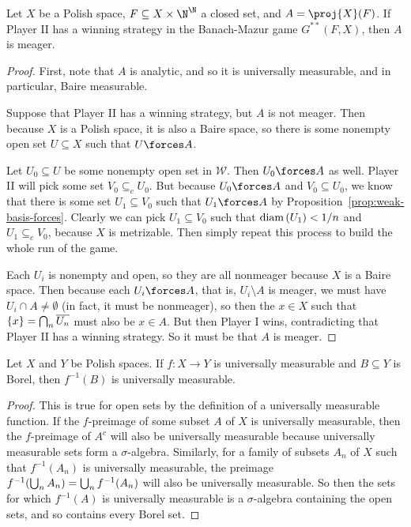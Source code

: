 \documentclass[10pt]{article}
\begin{document}
\begin{proposition}[Exercise 79]
    Let $X$ be a Polish space, $F \subseteq X \times \N^{\N}$ a closed set, and $A = \proj{X}(F)$.
        If Player II has a winning strategy in the Banach-Mazur game $G^{**}(F,X)$, then $A$ is meager.
\end{proposition}
\begin{proof}
    First, note that $A$ is analytic, and so it is universally measurable, and in particular, Baire measurable.

    Suppose that Player II has a winning strategy, but $A$ is not meager.
    Then because $X$ is a Polish space, it is also a Baire space, so there is some nonempty open set $U \subseteq X$ such that $U \forces A$.

    Let $U_0 \subseteq U$ be some nonempty open set in $\mathcal{W}$.
    Then $U_0 \forces A$ as well.
    Player II will pick some set $V_0 \subseteq_c U_0$.
    But because $U_0 \forces A$ and $V_0 \subseteq U_0$, we know that there is some set $U_1 \subseteq V_0$ such that $U_1 \forces A$ by Proposition~\ref{prop:weak-basis-forces}.
    Clearly we can pick $U_1 \subseteq V_0$ such that $\text{diam} \left( U_1 \right) < 1/n$ and $U_1 \subseteq_c V_0$, because $X$ is metrizable.
    Then simply repeat this process to build the whole run of the game.

    Each $U_i$ is nonempty and open, so they are all nonmeager because $X$ is a Baire space.
    Then because each $U_i \forces A$, that is, $U_i \setminus A$ is meager, we must have $U_i \cap A \neq \emptyset$ (in fact, it must be nonmeager), so then the $x \in X$ such that ${\left\{ {x} \right\}} = \bigcap_n \overline{U_n}$ must also be $x \in A$.
    But then Player I wins, contradicting that Player II has a winning strategy.
    So it must be that $A$ is meager.
\end{proof}

\begin{lemma}
    Let $X$ and $Y$ be Polish spaces.
    If $f : X \to Y$ is universally measurable and $B \subseteq Y$ is Borel, then $f^{-1}(B)$ is universally measurable.
\end{lemma}
\begin{proof}
    This is true for open sets by the definition of a universally measurable function.
    If the $f$-preimage of some subset $A$ of $X$ is universally measurable, then the $f$-preimage of $A^c$ will also be universally measurable because universally measurable sets form a $\sigma$-algebra.
    Similarly, for a family of subsets $A_n$ of $X$ such that $f^{-1}(A_n)$ is universally measurable, the preimage $f^{-1}{\left( {\bigcup_n A_n} \right)} = \bigcup_n f^{-1}(A_n)$ will also be universally measurable.
    So then the sets for which $f^{-1}(A)$ is universally measurable is a $\sigma$-algebra containing the open sets, and so contains every Borel set.
\end{proof}
\end{document}
